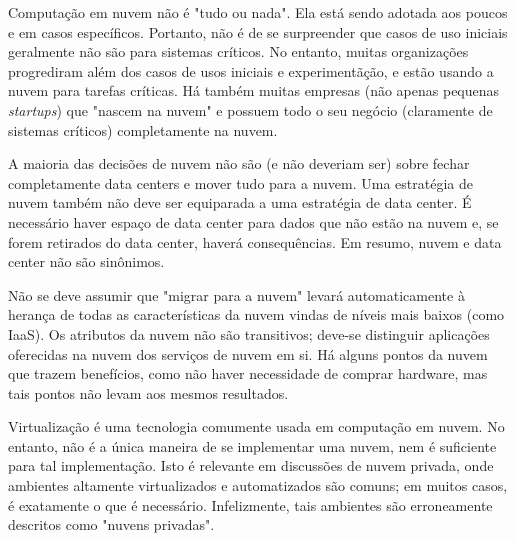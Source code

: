 \begin{enumerate}
        Computação em nuvem não é "tudo ou nada". Ela está sendo adotada aos poucos 
        e em casos específicos. Portanto, não é de se surpreender que casos de uso 
        iniciais geralmente não são para sistemas críticos. No entanto, muitas 
        organizações progrediram além dos casos de usos iniciais e experimentãção, e 
        estão usando a nuvem para tarefas críticas. Há também muitas empresas (não 
        apenas pequenas \emph{startups}) que "nascem na nuvem" e possuem todo o seu 
        negócio (claramente de sistemas críticos) completamente na nuvem.

        A maioria das decisões de nuvem não são (e não deveriam ser) sobre fechar 
        completamente data centers e mover tudo para a nuvem. Uma estratégia de 
        nuvem também não deve ser equiparada a uma estratégia de data center. É 
        necessário haver espaço de data center para dados que não estão na nuvem e, 
        se forem retirados do data center, haverá consequências. Em resumo, nuvem e 
        data center não são sinônimos.

        Não se deve assumir que "migrar para a nuvem" levará automaticamente à 
        herança de todas as características da nuvem vindas de níveis mais baixos 
        (como IaaS). Os atributos da nuvem não são transitivos; deve-se distinguir 
        aplicações oferecidas na nuvem dos serviços de nuvem em si. Há alguns pontos 
        da nuvem que trazem benefícios, como não haver necessidade de comprar 
        hardware, mas tais pontos não levam aos mesmos resultados.

        Virtualização é uma tecnologia comumente usada em computação em nuvem. No 
        entanto, não é a única maneira de se implementar uma nuvem, nem é suficiente 
        para tal implementação. Isto é relevante em discussões de nuvem privada, 
        onde ambientes altamente virtualizados e automatizados são comuns; em muitos 
        casos, é exatamente o que é necessário. Infelizmente, tais ambientes são 
        erroneamente descritos como "nuvens privadas".
\end{enumerate}
\undef\itemm
